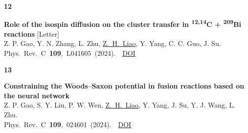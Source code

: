 \documentclass[10pt]{article}
\newlength{\numcol}
\newcommand{\cvnum}[2]{%
  \noindent\begin{minipage}[t]{\numcol}\color{accent}\bfseries #1\end{minipage}%
  \begin{minipage}[t]{\dimexpr\linewidth-\numcol\relax}#2\end{minipage}\par\vspace{7pt}%
}
\begin{document}
\cvnum{12}{\textbf{Role of the isospin diffusion on the cluster transfer in \textsuperscript{12,14}C + \textsuperscript{209}Bi
  reactions} \textcolor{accent}{\mbox{[Letter]}}\\
  Z. P. Gao, Y. N. Zhang, L. Zhu, \underline{Z.~H.~Liao}, Y. Yang, C. C. Guo, J. Su.\\ \mbox{Phys. Rev. C
  \textbf{109}, L041605 (2024).
  \textperiodcentered\ \href{https://journals.aps.org/prc/abstract/10.1103/PhysRevC.109.L041605}{DOI}}}

\cvnum{13}{\textbf{Constraining the Woods--Saxon potential in fusion reactions based on the
  neural network} \\
  Z. P. Gao, S. Y. Liu, P. W. Wen, \underline{Z.~H.~Liao}, Y. Yang, J. Su, Y. J. Wang, L. Zhu.\\ \mbox{Phys. Rev. C
  \textbf{109}, 024601 (2024).
  \textperiodcentered\ \href{https://journals.aps.org/prc/abstract/10.1103/PhysRevC.109.024601}{DOI}}}





\newpage
\end{document}
